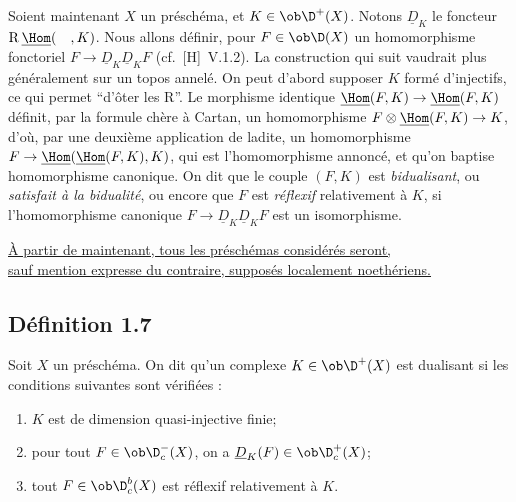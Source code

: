 Soient maintenant $X$ un préschéma, et $K \in \ob \D^{+}(X)$. Notons $\underline{D}_K$ le foncteur $\mathrm{R}\,\underline{\Hom}(\quad, K)$. Nous allons définir, pour $F \in \ob \D(X)$ un homomorphisme fonctoriel $F \to \underline{D}_K \underline{D}_K F$ (cf.~[H]~V.1.2). La construction qui suit vaudrait plus généralement sur un topos annelé. On peut d'abord supposer $K$
formé d'injectifs, ce qui permet ``d'ôter les $\mathrm{R}$''. Le morphisme identique $\underline{\Hom}(F,K) \to \underline{\Hom}(F,K)$ définit, par la formule chère à Cartan, un homomorphisme $F \otimes \underline{\Hom}(F,K) \to K$, d'où, par une deuxième application de ladite, un homomorphisme $F \to \underline{\Hom}(\underline{\Hom}(F,K), K)$, qui est l'homomorphisme annoncé, et qu'on baptise homomorphisme canonique. On dit que le couple $(F,K)$ est \emph{bidualisant}, ou \emph{satisfait à la bidualité}, ou encore que $F$ est \emph{réflexif} relativement à $K$, si l'homomorphisme canonique $F \to \underline{D}_K \underline{D}_K F$ est un isomorphisme.

\noindent\underline{À partir de maintenant, tous les préschémas considérés seront,}\\[-0.1em]\underline{sauf mention expresse du contraire, supposés localement noethériens.}

\subsection*{Définition 1.7}
Soit $X$ un préschéma. On dit qu'un complexe $K \in \ob \D^{+}(X)$ est dualisant si les conditions suivantes sont vérifiées :
\begin{enumerate}[label=(\roman*)]
\item $K$ est de dimension quasi-injective finie;
\item pour tout $F \in \ob \D_c^{-}(X)$, on a $\underline{D}_K(F) \in \ob \D_c^{+}(X)$;
\item tout $F \in \ob \D_c^{b}(X)$ est réflexif relativement à $K$.
\end{enumerate}

